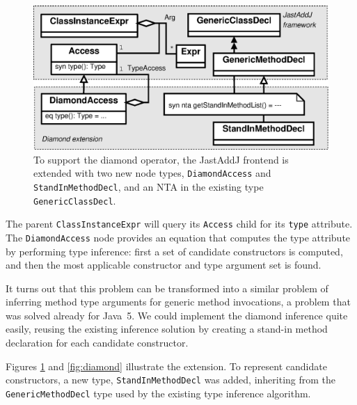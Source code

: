 {\begin{figure}
	\centering
	\includegraphics[width=\columnwidth]{figures/DiamondExtension.eps}
	\caption{To support the diamond operator, the JastAddJ frontend is extended with two new node types, \texttt{DiamondAccess} and \texttt{StandInMethodDecl}, and an NTA in the existing type \texttt{GenericClassDecl}.}
	\label{DiamondExtension}
\end{figure}


The parent \verb'ClassInstanceExpr' will query its \texttt{Access} child for
its \texttt{type} attribute.  The \texttt{DiamondAccess} node provides an
equation that computes the type attribute by performing type inference: first a
set of candidate constructors is computed, and then the most applicable
constructor and type argument set is found.

It turns out that this problem can be transformed into a similar problem of
inferring method type arguments for generic method invocations, a problem that
was solved already for Java~5. We could implement the diamond inference quite
easily, reusing the existing inference solution by creating a stand-in method
declaration for each candidate constructor.

Figures \ref{DiamondExtension} and \ref{fig:diamond} illustrate the extension.
To represent candidate constructors, a new type, \texttt{StandInMethodDecl} was
added, inheriting from the \texttt{GenericMethodDecl} type used by the existing
type inference algorithm. 

%

}
